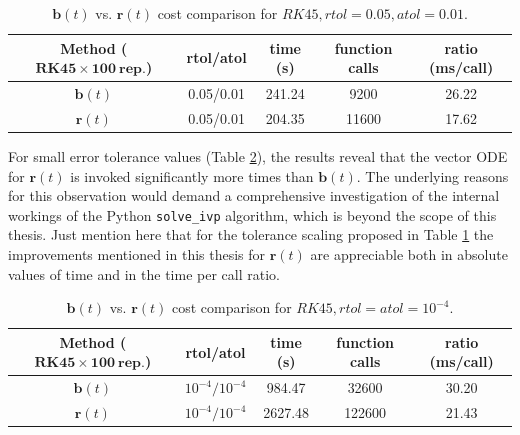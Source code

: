\begin{table}[ht]
            \bigskip
		\centering %
		\begin{tabular}{c c c c c} %
			\hline\hline %
			\textbf{Method ($\mathbf{RK45\times 100~rep.}$)} & \textbf{rtol/atol} & \textbf{time (s)} & \textbf{function calls} & \textbf{ratio (ms/call)} \\ [0.1ex] %
			\hline\hline 
			$\mathbf{b}(t)$ & 0.05/0.01 & 241.24 & 9200 & 26.22 \\ %
			$\mathbf{r}(t)$ & 0.05/0.01 & 204.35 & 11600 & 17.62 \\ [0.5ex] %
			\hline %
		\end{tabular}
		\caption{$\mathbf{b}(t)$ vs. $\mathbf{r}(t)$ cost comparison for $RK45, rtol=0.05, atol=0.01$.} 
       \label{table:btrt} 
\end{table}

\newpage

For small error tolerance values (Table \ref{table:btrt2}), the results reveal that the vector ODE for $\mathbf{r}(t)$ is invoked significantly more times than $\mathbf{b}(t)$. The underlying reasons for this observation would demand a comprehensive investigation of the internal workings of the Python \texttt{solve\_ivp} algorithm, which is beyond the scope of this thesis. Just mention here that for the tolerance scaling proposed in Table \ref{table:btrt} the improvements mentioned in this thesis for $\mathbf{r}(t)$ are appreciable both in absolute values of time and in the time per call ratio.

\begin{table}[ht]
            \bigskip
		\centering %
		\begin{tabular}{c c c c c} %
			\hline\hline %
			\textbf{Method ($\mathbf{RK45\times 100~rep.}$)} & \textbf{rtol/atol} & \textbf{time (s)} & \textbf{function calls} & \textbf{ratio (ms/call)} \\ [0.1ex] %
			\hline\hline 
			$\mathbf{b}(t)$ & $10^{-4}/10^{-4}$ & 984.47 & 32600 & 30.20 \\ %
			$\mathbf{r}(t)$ & $10^{-4}/10^{-4}$ & 2627.48 & 122600 & 21.43 \\ [0.5ex] %
			\hline %
		\end{tabular}
		\caption{$\mathbf{b}(t)$ vs. $\mathbf{r}(t)$ cost comparison for $RK45, rtol=atol=10^{-4}$.} 
       \label{table:btrt2} 
\end{table}

